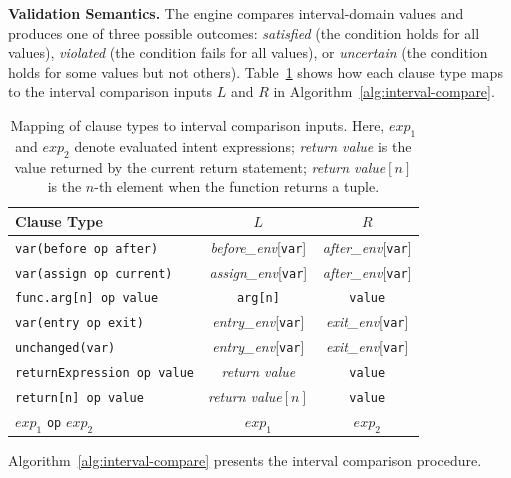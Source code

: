\documentclass[pdflatex,sn-basic]{sn-jnl}%
\theoremstyle{thmstyleone}%
\theoremstyle{thmstyletwo}%
\theoremstyle{thmstylethree}%
\begin{document}
\smallskip
\noindent\textbf{Validation Semantics.}
The engine compares interval-domain values and produces one of three possible outcomes: \textit{satisfied} (the condition holds for all values), \textit{violated} (the condition fails for all values), or \textit{uncertain} (the condition holds for some values but not others).
Table~\ref{tab:interval-mapping} shows how each clause type maps to the interval comparison inputs $L$ and $R$ in Algorithm~\ref{alg:interval-compare}.

\begin{table}[t]
\centering
\caption{Mapping of clause types to interval comparison inputs. Here, $\mathit{exp}_1$ and $\mathit{exp}_2$ denote evaluated intent expressions; \textit{return value} is the value returned by the current return statement; \textit{return value}$[n]$ is the $n$-th element when the function returns a tuple.}
\label{tab:interval-mapping}
\small
\begin{tabular}{lcc}
\toprule
Clause Type & $L$ & $R$ \\
\midrule
\texttt{var(before op after)} & \textit{before\_env}[\texttt{var}] & \textit{after\_env}[\texttt{var}] \\
\texttt{var(assign op current)} & \textit{assign\_env}[\texttt{var}] & \textit{after\_env}[\texttt{var}] \\
\texttt{func.arg[n] op value} & \texttt{arg[n]} & \texttt{value} \\
\midrule
\texttt{var(entry op exit)} & \textit{entry\_env}[\texttt{var}] & \textit{exit\_env}[\texttt{var}] \\
\texttt{unchanged(var)} & \textit{entry\_env}[\texttt{var}] & \textit{exit\_env}[\texttt{var}] \\
\midrule
\texttt{returnExpression op value} & \textit{return value} & \texttt{value} \\
\texttt{return[n] op value} & \textit{return value}$[n]$ & \texttt{value} \\
$\mathit{exp}_1$ \texttt{op} $\mathit{exp}_2$ & $\mathit{exp}_1$ & $\mathit{exp}_2$ \\
\bottomrule
\end{tabular}
\end{table}

Algorithm~\ref{alg:interval-compare} presents the interval comparison procedure.
\end{document}
